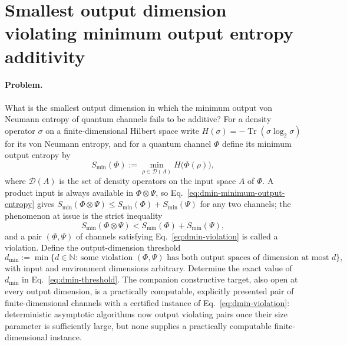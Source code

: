 \section{Smallest output dimension violating minimum output entropy additivity}
\label{sec:op_e724615844c52297}

\paragraph{Problem.}
What is the smallest output dimension in which the minimum output von Neumann
entropy of quantum channels fails to be additive?  For a density operator
$\sigma$ on a finite-dimensional Hilbert space write
$H(\sigma)=-\operatorname{Tr}(\sigma\log_2\sigma)$ for its von Neumann
entropy, and for a quantum channel $\Phi$ define its minimum output entropy by
\begin{equation}
  S_{\min}(\Phi):=\min_{\rho\in\mathcal D(A)}H\bigl(\Phi(\rho)\bigr),
  \label{eq:dmin-minimum-output-entropy}
\end{equation}
where $\mathcal D(A)$ is the set of density operators on the input space $A$
of $\Phi$.  A product input is always available in $\Phi\otimes\Psi$, so
Eq.~\eqref{eq:dmin-minimum-output-entropy} gives
$S_{\min}(\Phi\otimes\Psi)\leq S_{\min}(\Phi)+S_{\min}(\Psi)$ for any two
channels; the phenomenon at issue is the strict inequality
\begin{equation}
  S_{\min}(\Phi\otimes\Psi)<S_{\min}(\Phi)+S_{\min}(\Psi),
  \label{eq:dmin-violation}
\end{equation}
and a pair $(\Phi,\Psi)$ of channels satisfying
Eq.~\eqref{eq:dmin-violation} is called a violation.  Define the
output-dimension threshold
\begin{equation}
  d_{\min}:=\min\bigl\{d\in\mathbb N:\ \text{some violation }(\Phi,\Psi)
  \text{ has both output spaces of dimension at most }d\bigr\},
  \label{eq:dmin-threshold}
\end{equation}
with input and environment dimensions arbitrary.  Determine the exact value of
$d_{\min}$ in Eq.~\eqref{eq:dmin-threshold}.  The companion constructive target, also open at every output dimension, is a
practically computable, explicitly presented pair of finite-dimensional
channels with a certified instance of Eq.~\eqref{eq:dmin-violation}:
deterministic asymptotic algorithms now output violating pairs once their
size parameter is sufficiently large, but none supplies a practically
computable finite-dimensional instance.

